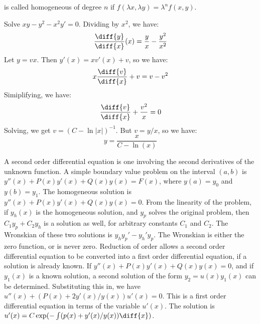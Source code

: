 \documentclass[crop=false,class=article,oneside]{standalone}
\begin{document}
        is called homogeneous of degree $n$ if
        $f(\lambda{x},\lambda{y})=\lambda^{n}f(x,y)$.
        \begin{example}
            Solve $xy-y^{2}-x^{2}y'=0$. Dividing by $x^{2}$,
            we have:
            \begin{equation*}
                \frac{\diff{y}}{\diff{x}}(x)
                =\frac{y}{x}-\frac{y^{2}}{x^{2}}
            \end{equation*}
            Let $y=vx$. Then $y'(x)=xv'(x)+v$, so we have:
            \begin{equation*}
                x\frac{\diff{v}}{\diff{x}}+v=v-v^{2}
            \end{equation*}
            Simiplifying, we have:
            \begin{equation*}
                \frac{\diff{v}}{\diff{x}}+\frac{v^{2}}{x}=0
            \end{equation*}
            Solving, we get $v=(C-\ln|x|)^{-1}$.
            But $v=y/x$, so we have:
            \begin{equation*}
                y=\frac{x}{C-\ln(x)}
            \end{equation*}
        \end{example}
        A second order differential equation is one involving
        the second derivatives of the unknown function. A simple
        boundary value problem on the interval $(a,b)$ is
        $y''(x)+P(x)y'(x)+Q(x)y(x)=F(x)$, where
        $y(a)=y_{0}$ and $y(b)=y_{1}$. The homogeneous solution
        is $y''(x)+P(x)y'(x)+Q(x)y(x)=0$. From the linearity of
        the problem, if $y_{h}(x)$ is the homogeneous solution,
        and $y_{p}$ solves the original problem, then
        $C_{1}y_{p}+C_{2}y_{h}$ is a solution as well, for
        arbitrary constants $C_{1}$ and $C_{2}$. The Wronskian
        of these two solutions is $y_{h}y_{p}'-y_{h}'y_{p}$.
        The Wronskian is either the zero function, or is
        never zero. Reduction of order allows a second order
        differential equation to be converted into a first
        order differential equation, if a solution is already
        known. If $y''(x)+P(x)y'(x)+Q(x)y(x)=0$, and if
        $y_{1}(x)$ is a known solution, a second
        solution of the form $y_{2}=u(x)y_{1}(x)$ can be
        determined. Substituting this in, we have
        $u''(x)+(P(x)+2y'(x)/y(x))u'(x)=0$. This is a first
        order differential equation in terms of the variable
        $u'(x)$. The solution is
        $u'(x)=C\exp(-\int(p(x)+y'(x)/y(x))\diff{x})$.
\end{document}
